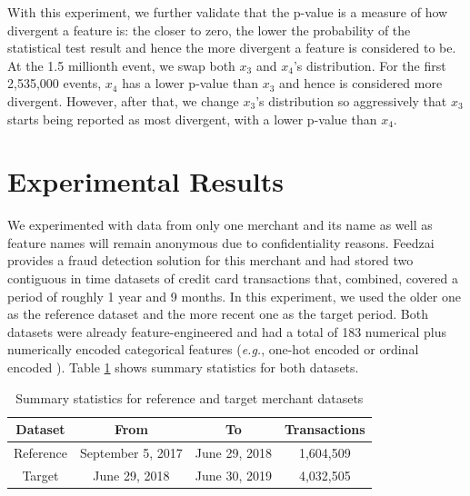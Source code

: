 \documentclass[sigconf]{acmart}
\begin{document}
With this experiment, we further validate that the p-value is a measure of how divergent a feature is: the closer to zero, the lower the probability of the statistical test result and hence the more divergent a feature is considered to be. At the 1.5 millionth event, we swap both $x_3$ and $x_4$'s distribution. For the first 2,535,000 events, $x_4$ has a lower p-value than $x_3$ and hence is considered more divergent. However, after that, we change $x_3$'s distribution so aggressively that $x_3$ starts being reported as most divergent, with a lower p-value than $x_4$.

\fi

\section{Experimental Results}
We experimented with data from only one merchant and its name as well as feature names will remain anonymous due to confidentiality reasons. Feedzai provides a fraud detection solution for this merchant and had stored two contiguous in time datasets of credit card transactions that, combined, covered a period of roughly 1 year and 9 months. In this experiment, we used the older one as the reference dataset and the more recent one as the target period. Both datasets were already feature-engineered \cite{Domingos-ML-Feat-Eng} and had a total of 183 numerical plus numerically encoded categorical features (\textit{e.g.}, one-hot encoded or ordinal encoded \cite{categoricalencoding}). Table \ref{tbl:merchant1-datasets-summary} shows summary statistics for both datasets.
\begin{table}[!htb]
    \begin{center}
        \begin{tabular}{|c|c|c|c|}
        \hline
        \textbf{Dataset} & \textbf{From}              & \textbf{To}           & \multicolumn{1}{l|}{\textbf{Transactions}} \\ \hline
        Reference        & September 5, 2017 & June 29, 2018 & 1,604,509                                  \\ \hline
        Target           & June 29, 2018      & June 30, 2019 & 4,032,505                                  \\ \hline
        \end{tabular}
        \caption{Summary statistics for reference and target merchant datasets}
        \label{tbl:merchant1-datasets-summary}
    \end{center}
\end{table}
\end{document}

